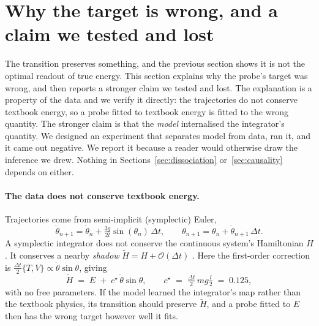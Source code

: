 \section{Why the target is wrong, and a claim we tested and lost}
\label{sec:mechanism}

The transition preserves something, and the previous section shows it is not the optimal readout of
true energy. This section explains why the probe's target was wrong, and then reports a stronger
claim we tested and lost. The explanation is a property of the data and we verify it directly: the
trajectories do not conserve textbook energy, so a probe fitted to textbook energy is fitted to the
wrong quantity. The stronger claim is that the \emph{model} internalised the integrator's quantity.
We designed an experiment that separates model from data, ran it, and it came out negative. We report
it because a reader would otherwise draw the inference we drew. Nothing in
Sections~\ref{sec:dissociation} or~\ref{sec:causality} depends on either.

\paragraph{The data does not conserve textbook energy.}
Trajectories come from semi-implicit (symplectic) Euler,
\begin{equation}
\dot\theta_{n+1} = \dot\theta_n + \tfrac{3g}{2l}\sin(\theta_n)\,\Delta t,
\qquad
\theta_{n+1} = \theta_n + \dot\theta_{n+1}\,\Delta t .
\end{equation}
A symplectic integrator does not conserve the continuous system's Hamiltonian $H$. It conserves a
nearby \emph{shadow} $\tilde H = H + \mathcal{O}(\Delta t)$ \citep{hairer2006geometric}. Here the
first-order correction is $\tfrac{\Delta t}{2}\{T,V\} \propto \dot\theta\sin\theta$, giving
\begin{equation}
\tilde H \;=\; E \;+\; c^\star\,\dot\theta\sin\theta,
\qquad
c^\star \;=\; \tfrac{\Delta t}{2}\,mg\tfrac{l}{2} \;=\; 0.125 ,
\label{eq:shadow}
\end{equation}
with no free parameters. If the model learned the integrator's map rather than the textbook physics,
its transition should preserve $\tilde H$, and a probe fitted to $E$ then has the wrong target
however well it fits.

